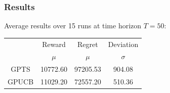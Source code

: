 \begin{frame}

\frametitle{Results}

Average results over 15 runs at time horizon $T = 50$:

\begin{table}
	\begin{tabular}{|c|cc|c|}
	\hline \hline
		\cellcolor{blue!25} & Reward 	& Regret	& Deviation \\
	\cline{2-4}
		\cellcolor{blue!25} & $\mu$		& $\mu$		& $\sigma$	\\
	\hline \hline
		GPTS 				& 10772.60	& 97205.53	& 904.08	\\
	\hline
		GPUCB				& 11029.20	& 72557.20	& 510.36	\\
	\hline \hline
	\end{tabular}
\end{table}

\end{frame}

